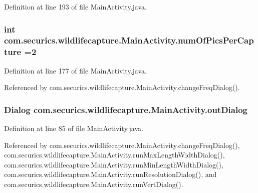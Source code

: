 Definition at line 193 of file Main\+Activity.\+java.

\subsubsection[{num\+Of\+Pics\+Per\+Capture}]{\setlength{\rightskip}{0pt plus 5cm}int com.\+securics.\+wildlifecapture.\+Main\+Activity.\+num\+Of\+Pics\+Per\+Capture =2\hspace{0.3cm}{\ttfamily [static]}}\label{classcom_1_1securics_1_1wildlifecapture_1_1_main_activity_ae072a2e4ac5cc978e2a87b866f9eb345}


Definition at line 177 of file Main\+Activity.\+java.



Referenced by com.\+securics.\+wildlifecapture.\+Main\+Activity.\+change\+Freq\+Dialog().

\subsubsection[{out\+Dialog}]{\setlength{\rightskip}{0pt plus 5cm}Dialog com.\+securics.\+wildlifecapture.\+Main\+Activity.\+out\+Dialog\hspace{0.3cm}{\ttfamily [private]}}\label{classcom_1_1securics_1_1wildlifecapture_1_1_main_activity_ade48e47c6e28618977b7fc930b32b9c0}


Definition at line 85 of file Main\+Activity.\+java.



Referenced by com.\+securics.\+wildlifecapture.\+Main\+Activity.\+change\+Freq\+Dialog(), com.\+securics.\+wildlifecapture.\+Main\+Activity.\+run\+Max\+Length\+Width\+Dialog(), com.\+securics.\+wildlifecapture.\+Main\+Activity.\+run\+Min\+Length\+Width\+Dialog(), com.\+securics.\+wildlifecapture.\+Main\+Activity.\+run\+Resolution\+Dialog(), and com.\+securics.\+wildlifecapture.\+Main\+Activity.\+run\+Vert\+Dialog().

